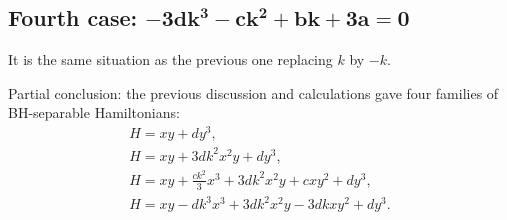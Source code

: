 \documentclass[pdftex]{sigma}%
\numberwithin{equation}{section}
\begin{document}
\subsection*{Fourth case: $\boldsymbol{-3dk^3-ck^2+bk+3a=0}$}

It is the same situation as the previous one replacing $k$ by $-k$.

Partial conclusion: the previous discussion and calculations gave four families of BH-separable Hamiltonians:
\begin{gather*}
H=xy+dy^3,
\\
H=xy+3dk^2x^2y+dy^3,
\\
H=xy+\frac{ck^2}{3}x^3+3dk^2x^2y+cxy^2+dy^3,
\\
H=xy-dk^3x^3+3dk^2x^2y-3dkxy^2+dy^3.
\end{gather*}
\end{document}
